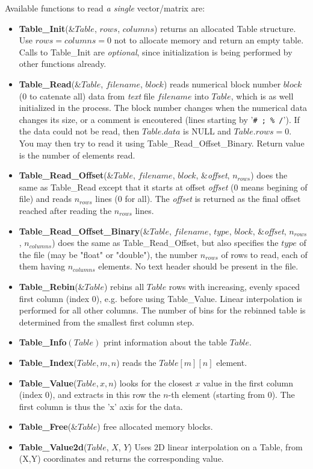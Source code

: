 Available functions to read \emph{a single} vector/matrix are:
\begin{itemize}
\item {\bfseries Table\_Init}(\&$Table$, $rows$, $columns$) returns an allocated
  Table structure. Use $rows=columns=0$ not to allocate memory and return an empty table.
  Calls to Table\_Init are \emph{optional}, since initialization is being
  performed by other functions already.
\item {\bfseries Table\_Read}(\&$Table$, $filename$, $block$)
  reads numerical block number
  $block$ (0 to catenate all) data from \emph{text} file $filename$ into $Table$,
  which is as well initialized in the process.
  The block number changes when the numerical data changes its size,
  or a comment is encoutered (lines starting
  by '\verb+# ; % /+'). If the data could not be read,
  then $Table.data$ is NULL and $Table.rows = 0$.
  You may then try to read it using Table\_Read\_Offset\_Binary.
  Return value is the number of elements read.
\item {\bfseries Table\_Read\_Offset}(\&$Table$, $filename$, $block$, \&\textit{offset}, $n_{rows}$)
  does the same as Table\_Read except that it starts at offset \textit{offset}
  (0 means begining of file) and reads $n_{rows}$ lines (0 for all).
  The \textit{offset} is returned as the final offset reached after
  reading the $n_{rows}$ lines.
\item {\bfseries Table\_Read\_Offset\_Binary}(\&$Table$, $filename$, $type$,
  $block$, \&\textit{offset}, $n_{rows}$, $n_{columns}$) does the same as
  Table\_Read\_Offset, but also specifies the $type$ of the file (may
  be "float" or "double"), the number $n_{rows}$ of rows to read, each
  of them having $n_{columns}$ elements. No text header should be present
  in the file.
\item {\bfseries Table\_Rebin}(\&$Table$) rebins all $Table$ rows with increasing, evenly spaced first column (index 0), e.g. before using Table\_Value. Linear interpolation is performed for all other columns. The number of bins for the rebinned table is determined from the smallest first column step.
\item {\bfseries Table\_Info}$(Table)$ print information about the table $Table$.
\item {\bfseries Table\_Index}($Table, m, n$) reads the $Table[m][n]$ element.
\item {\bfseries Table\_Value}($Table, x, n$) looks for the closest $x$
  value in the first column (index 0), and extracts in this row the
  $n$-th element (starting from 0). The first column is thus the 'x' axis for the data.
\item {\bfseries Table\_Free}(\&$Table$) free allocated memory blocks.
\item {\bfseries Table\_Value2d}($Table$, $X$, $Y$) Uses 2D linear interpolation on a Table, from (X,Y) coordinates and returns the corresponding value.
\end{itemize}

